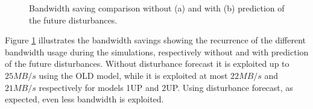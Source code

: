\begin{figure}[h!]
\centering
{}
\caption{Bandwidth saving comparison without (a) and with (b) prediction of the future disturbances.}
\label{fig:BW}
\end{figure}

Figure \ref{fig:BW} illustrates the bandwidth savings showing the recurrence of the different bandwidth usage during the simulations, respectively without and with prediction of the future disturbances. Without disturbance forecast it is exploited up to $25MB/s$ using the OLD model, while it is exploited at most $22MB/s$ and $21MB/s$ respectively for models 1UP and 2UP. Using disturbance forecast, as expected, even less bandwidth is exploited.

